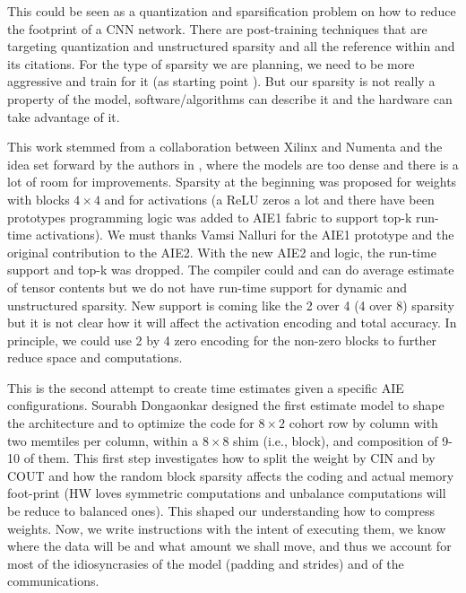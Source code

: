 \documentclass[conference]{IEEEtran}
\begin{document}
This could be seen as a quantization and sparsification problem on how
to reduce the footprint of a CNN network. There are post-training
techniques that are targeting quantization and unstructured sparsity
\cite{frantar2023gptq} and all the reference within and its
citations. For the type of sparsity we are planning, we need to be
more aggressive and train for it (as starting point
\cite{abs-2102-11289}).  But our sparsity is not really a property of
the model, software/algorithms can describe it and the hardware can
take advantage of it.

This work stemmed from a collaboration between Xilinx and Numenta and
the idea set forward by the authors in \cite{ahmad2019dense}, where
the models are too dense and there is a lot of room for
improvements. Sparsity at the beginning was proposed for weights with
blocks $4\times 4$ and for activations (a ReLU zeros a lot and there
have been prototypes programming logic was added to AIE1 fabric to
support top-k run-time activations). We must thanks Vamsi Nalluri for
the AIE1 prototype and the original contribution to the AIE2. With the
new AIE2 and logic, the run-time support and top-k was dropped. The
compiler could and can do average estimate of tensor contents but we
do not have run-time support for dynamic and unstructured
sparsity. New support is coming like the 2 over 4 (4 over 8) sparsity
but it is not clear how it will affect the activation encoding and
total accuracy. In principle, we could use 2 by 4 zero encoding for
the non-zero blocks to further reduce space and computations.

This is the second attempt to create time estimates given a specific
AIE configurations. Sourabh Dongaonkar designed the first estimate
model to shape the architecture and to optimize the code for $8\times
2$ cohort row by column with two memtiles per column, within a
$8\times 8$ shim (i.e., block), and composition of 9-10 of them. This
first step investigates how to split the weight by CIN and by COUT and
how the random block sparsity affects the coding and actual memory
foot-print (HW loves symmetric computations and unbalance computations
will be reduce to balanced ones). This shaped our understanding how to
compress weights. Now, we write instructions with the intent of
executing them, we know where the data will be and what amount we
shall move, and thus we account for most of the idiosyncrasies of the
model (padding and strides) and of the communications.
\end{document}

